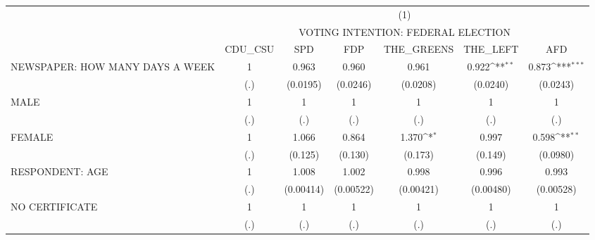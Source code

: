 {
\def\sym#1{\ifmmode^{#1}\else\(^{#1}\)\fi}
\begin{tabular}{l*{6}{c}}
\hline\hline
                              &\multicolumn{6}{c}{(1)}                                                                                                \\
                              &\multicolumn{6}{c}{VOTING INTENTION: FEDERAL ELECTION}                                                                 \\
                              &   CDU\_CSU         &       SPD         &       FDP         &THE\_GREENS         &  THE\_LEFT         &       AFD         \\
\hline
NEWSPAPER: HOW MANY DAYS A WEEK&         1         &     0.963         &     0.960         &     0.961         &     0.922\sym{**} &     0.873\sym{***}\\
                              &       (.)         &  (0.0195)         &  (0.0246)         &  (0.0208)         &  (0.0240)         &  (0.0243)         \\
[1em]
MALE                          &         1         &         1         &         1         &         1         &         1         &         1         \\
                              &       (.)         &       (.)         &       (.)         &       (.)         &       (.)         &       (.)         \\
[1em]
FEMALE                        &         1         &     1.066         &     0.864         &     1.370\sym{*}  &     0.997         &     0.598\sym{**} \\
                              &       (.)         &   (0.125)         &   (0.130)         &   (0.173)         &   (0.149)         &  (0.0980)         \\
[1em]
RESPONDENT: AGE               &         1         &     1.008         &     1.002         &     0.998         &     0.996         &     0.993         \\
                              &       (.)         & (0.00414)         & (0.00522)         & (0.00421)         & (0.00480)         & (0.00528)         \\
[1em]
NO CERTIFICATE                &         1         &         1         &         1         &         1         &         1         &         1         \\
                              &       (.)         &       (.)         &       (.)         &       (.)         &       (.)         &       (.)         \\

\end{tabular}}
